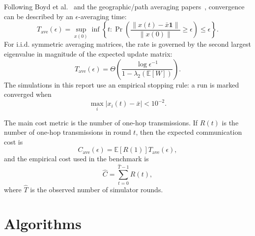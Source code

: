 \documentclass[conference]{IEEEtran}
\begin{document}
Following Boyd et al.~\cite{boyd2006randomized} and the geographic/path averaging papers~\cite{dimakis2006geographic,benezit2008order}, convergence can be described by an $\epsilon$-averaging time:
\begin{equation}
T_{\mathrm{ave}}(\epsilon)
= \sup_{x(0)}
\inf\left\{t:
\Pr\left(
\frac{\|x(t)-\bar{x}\mathbf{1}\|}{\|x(0)\|}\geq \epsilon
\right)\leq \epsilon
\right\}.
\end{equation}
For i.i.d. symmetric averaging matrices, the rate is governed by the second largest eigenvalue in magnitude of the expected update matrix:
\begin{equation}
T_{\mathrm{ave}}(\epsilon)
= \Theta\left(
\frac{\log \epsilon^{-1}}{1-\lambda_2(\mathbb{E}[W])}
\right).
\label{eq:spectral}
\end{equation}
The simulations in this report use an empirical stopping rule: a run is marked converged when
\begin{equation}
    \max_i |x_i(t)-\bar{x}| < 10^{-2}.
\end{equation}

The main cost metric is the number of one-hop transmissions. If $R(t)$ is the number of one-hop transmissions in round $t$, then the expected communication cost is
\begin{equation}
    C_{\mathrm{ave}}(\epsilon)=\mathbb{E}[R(1)]T_{\mathrm{ave}}(\epsilon),
\end{equation}
and the empirical cost used in the benchmark is
\begin{equation}
    \widehat{C}=\sum_{t=0}^{\widehat{T}-1}R(t),
\end{equation}
where $\widehat{T}$ is the observed number of simulator rounds.

\section{Algorithms}
\end{document}
